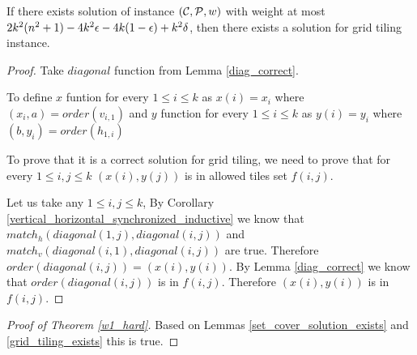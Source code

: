 \begin{lemma}
\label{grid_tiling_exists}
	If there exists solution of instance $(\mathcal{C}, \mathcal{P}, w)$
	with weight at most $2k^2(n^2+1) - 4k^2\epsilon -4k(1-\epsilon) +k^2\delta$,
	then there exists a solution for grid tiling instance.
\end{lemma}

\begin{proof}
Take $diagonal$ function from Lemma \ref{diag_correct}.

To define $x$ funtion 
for every $1 \le i \le k$ as $x(i) = x_i$
where $(x_i, a) = order(v_{i,1})$
and $y$ function 
for every $1 \le i \le k$ as $y(i) = y_i$
where $(b, y_i) = order(h_{1,i})$

To prove that it is a correct solution for grid tiling,
we need to prove that 
for every $1 \le i,j \le k$ $(x(i), y(j))$ is in
allowed tiles set $f(i,j)$.

Let us take any $1 \le i,j \le k$,
By Corollary \ref{vertical_horizontal_synchronized_inductive}
we know that $match_h(diagonal(1, j),diagonal(i, j))$ and
$match_v(diagonal(i, 1),diagonal(i, j))$ are true.
Therefore $order(diagonal(i,j)) = (x(i), y(i))$.
By Lemma \ref{diag_correct} we know that 
$order(diagonal(i,j))$ is in $f(i,j)$.
Therefore 
$(x(i), y(i))$
is in $f(i,j)$.

\end{proof}

\begin{proof}[Proof of Theorem \ref{w1_hard}]
Based on Lemmas \ref{set_cover_solution_exists} and \ref{grid_tiling_exists}
this is true.
\end{proof}
